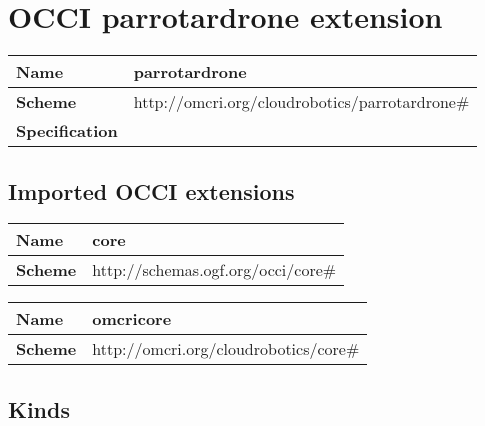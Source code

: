 \section{OCCI parrotardrone extension}
\begin{center}
\begin{tabular}{|l|l|}
  \hline
  \textbf{Name} & parrotardrone \\
  \hline  
  \textbf{Scheme} & http://omcri.org/cloudrobotics/parrotardrone\# \\
  \hline
  \textbf{Specification} &  \\
  \hline
\end{tabular}
\end{center}

\subsection{Imported OCCI extensions}

\begin{center} 
\begin{tabular}{|l|l|}
  \hline
  \textbf{Name} & core \\
  \hline  
  \textbf{Scheme} & http://schemas.ogf.org/occi/core\# \\
  \hline
\end{tabular}
\end{center}
\begin{center} 
\begin{tabular}{|l|l|}
  \hline
  \textbf{Name} & omcricore \\
  \hline  
  \textbf{Scheme} & http://omcri.org/cloudrobotics/core\# \\
  \hline
\end{tabular}
\end{center}


\subsection{Kinds}
